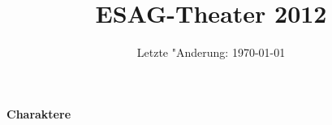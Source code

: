 \documentclass{scrartcl}
\newcommand{\s}[1]{\speaker #1}
\newcommand{\kregie}{\shortdirection}
\newcommand{\Frodo}{Frodo\xspace}
\begin{document}
%
%
\title{ESAG-Theater 2012}
\author{}
\date{Letzte "Anderung: \today}
\maketitle
\tableofcontents
%
%
%
%
\newpage
\textbf{Charaktere}


































\end{document}
